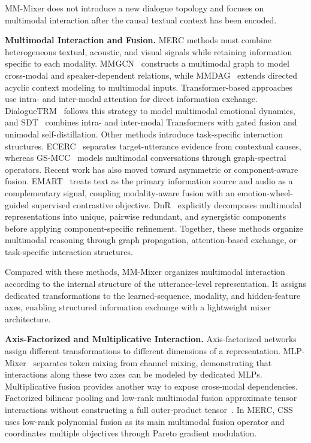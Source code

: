 \documentclass[letterpaper]{article} %
\begin{document}
MM-Mixer does not introduce a new dialogue topology and focuses on multimodal interaction after the causal textual context has been encoded.

\noindent\textbf{Multimodal Interaction and Fusion.}
MERC methods must combine heterogeneous textual, acoustic, and visual signals while retaining information specific to each modality. MMGCN~\cite{mmgcn} constructs a multimodal graph to model cross-modal and speaker-dependent relations, while MMDAG~\cite{mmdag} extends directed acyclic context modeling to multimodal inputs. Transformer-based approaches use intra- and inter-modal attention for direct information exchange. DialogueTRM~\cite{dialoguetrm} follows this strategy to model multimodal emotional dynamics, and SDT~\cite{sdt} combines intra- and inter-modal Transformers with gated fusion and unimodal self-distillation. Other methods introduce task-specific interaction structures. ECERC~\cite{ecerc} separates target-utterance evidence from contextual causes, whereas GS-MCC~\cite{gsmcc} models multimodal conversations through graph-spectral operators. Recent work has also moved toward asymmetric or component-aware fusion. EMART~\cite{emart} treats text as the primary information source and audio as a complementary signal, coupling modality-aware fusion with an emotion-wheel-guided supervised contrastive objective. DnR~\cite{dnr} explicitly decomposes multimodal representations into unique, pairwise redundant, and synergistic components before applying component-specific refinement. Together, these methods organize multimodal reasoning through graph propagation, attention-based exchange, or task-specific interaction structures.

Compared with these methods, MM-Mixer organizes multimodal interaction according to the internal structure of the utterance-level representation. It assigns dedicated transformations to the learned-sequence, modality, and hidden-feature axes, enabling structured information exchange with a lightweight mixer architecture.

\noindent\textbf{Axis-Factorized and Multiplicative Interaction.}
Axis-factorized networks assign different transformations to different dimensions of a representation. MLP-Mixer~\cite{mlpmixer} separates token mixing from channel mixing, demonstrating that interactions along these two axes can be modeled by dedicated MLPs. Multiplicative fusion provides another way to expose cross-modal dependencies. Factorized bilinear pooling and low-rank multimodal fusion approximate tensor interactions without constructing a full outer-product tensor~\cite{mfb,lmf}. In MERC, CSS~\cite{css} uses low-rank polynomial fusion as its main multimodal fusion operator and coordinates multiple objectives through Pareto gradient modulation.
\end{document}
